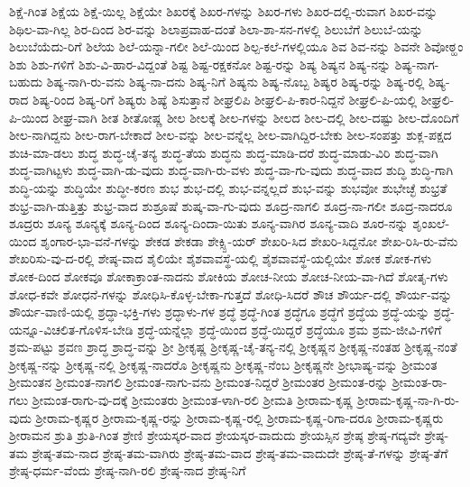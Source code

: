 {ಶಿಕ್ಷೆ-ಗಿಂತ
ಶಿಕ್ಷೆಯ
ಶಿಕ್ಷೆ-ಯಿಲ್ಲ
ಶಿಕ್ಷೆಯೇ
ಶಿಖರಕ್ಕೆ
ಶಿಖರ-ಗಳನ್ನು
ಶಿಖರ-ಗಳು
ಶಿಖರ-ದಲ್ಲಿ-ರುವಾಗ
ಶಿಖರ-ವನ್ನು
ಶಿಥಿಲ-ವಾ-ಗಿಲ್ಲ
ಶಿರ-ದಿಂದ
ಶಿರ-ವನ್ನು
ಶಿಲಾಪ್ರವಾಹ-ದಂತೆ
ಶಿಲಾ-ಶಾ-ಸನ-ಗಳಲ್ಲಿ
ಶಿಲುಬೆಗೆ
ಶಿಲುಬೆ-ಯನ್ನು
ಶಿಲುಬೆಯೆದು-ರಿಗೆ
ಶಿಲೆಯ
ಶಿಲೆ-ಯನ್ನಾ-ಗಲೀ
ಶಿಲೆ-ಯಿಂದ
ಶಿಲ್ಪ-ಕಲೆ-ಗಳಲ್ಲಿಯೂ
ಶಿವ
ಶಿವ-ನನ್ನು
ಶಿವನೇ
ಶಿವೋಠ್ಹಂ
ಶಿಶು
ಶಿಶು-ಗಳಿಗೆ
ಶಿಶು-ವಿ-ಹಾರ-ವಿದ್ದಂತೆ
ಶಿಷ್ಟ
ಶಿಷ್ಟ-ರಕ್ಷಕನೋ
ಶಿಷ್ಟ-ರನ್ನು
ಶಿಷ್ಯ
ಶಿಷ್ಯನ
ಶಿಷ್ಯ-ನನ್ನು
ಶಿಷ್ಯ-ನಾಗ-ಬಹುದು
ಶಿಷ್ಯ-ನಾಗಿ-ರು-ವನು
ಶಿಷ್ಯ-ನಾ-ದನು
ಶಿಷ್ಯ-ನಿಗೆ
ಶಿಷ್ಯನು
ಶಿಷ್ಯ-ನೊಬ್ಬ
ಶಿಷ್ಯರ
ಶಿಷ್ಯ-ರನ್ನು
ಶಿಷ್ಯ-ರಲ್ಲಿ
ಶಿಷ್ಯ-ರಾದ
ಶಿಷ್ಯ-ರಿಂದ
ಶಿಷ್ಯ-ರಿಗೆ
ಶಿಷ್ಯರು
ಶಿಷ್ಯೆ
ಶಿಸುತ್ತಾನೆ
ಶೀಘ್ರಲಿಪಿ
ಶೀಘ್ರಲಿ-ಪಿ-ಕಾರ-ನಿದ್ದನೆ
ಶೀಘ್ರಲಿ-ಪಿ-ಯಲ್ಲಿ
ಶೀಘ್ರಲಿ-ಪಿ-ಯಿಂದ
ಶೀಘ್ರ-ವಾಗಿ
ಶೀತ
ಶೀತೋಷ್ಣ
ಶೀಲ
ಶೀಲಕ್ಕೆ
ಶೀಲ-ಗಳನ್ನು
ಶೀಲದ
ಶೀಲ-ದಲ್ಲಿ
ಶೀಲ-ದಷ್ಟು
ಶೀಲ-ದೊಂದಿಗೆ
ಶೀಲ-ನಾಗಿದ್ದನು
ಶೀಲ-ರಾಗ-ಬೇಕಾದೆ
ಶೀಲ-ವನ್ನು
ಶೀಲ-ವನ್ನೆಲ್ಲ
ಶೀಲ-ವಾಗಿದ್ದಿರ-ಬೇಕು
ಶೀಲ-ಸಂಪತ್ತು
ಶುಕ್ಲ-ಪಕ್ಷದ
ಶುಚಿ-ಮಾ-ಡಲು
ಶುದ್ಧ
ಶುದ್ಧ-ಚೈ-ತನ್ಯ
ಶುದ್ಧ-ತೆಯ
ಶುದ್ಧನು
ಶುದ್ಧ-ಮಾಡಿ-ದರೆ
ಶುದ್ಧ-ಮಾಡು-ವಿರಿ
ಶುದ್ಧ-ವಾಗಿ
ಶುದ್ಧ-ವಾಗಿಟ್ಟಳು
ಶುದ್ಧ-ವಾಗಿ-ಡು-ವುದು
ಶುದ್ಧ-ವಾಗಿ-ರು-ವಳು
ಶುದ್ಧ-ವಾ-ಗು-ವುದು
ಶುದ್ಧ-ವಾದ
ಶುದ್ಧಿ
ಶುದ್ಧಿ-ಗಾಗಿ
ಶುದ್ಧಿ-ಯನ್ನು
ಶುದ್ಧಿಯೇ
ಶುದ್ಧೀ-ಕರಣ
ಶುಭ
ಶುಭ-ದಲ್ಲಿ
ಶುಭ-ವನ್ನಲ್ಲದೆ
ಶುಭ-ವನ್ನು
ಶುಭವೋ
ಶುಭೇಚ್ಛೆ
ಶುಭ್ರತೆ
ಶುಭ್ರ-ವಾಗಿ-ಡುತ್ತಿತ್ತು
ಶುಭ್ರ-ವಾದ
ಶುಶ್ರೂಷೆ
ಶುಷ್ಕ-ವಾ-ಗು-ವುದು
ಶೂದ್ರ-ನಾಗಲಿ
ಶೂದ್ರ-ನಾ-ಗಲೀ
ಶೂದ್ರ-ನಾದರೂ
ಶೂದ್ರರು
ಶೂನ್ಯ
ಶೂನ್ಯಕ್ಕೆ
ಶೂನ್ಯ-ದಿಂದ
ಶೂನ್ಯ-ದಿಂದಾ-ಯಿತು
ಶೂನ್ಯ-ವಾಗಿರ
ಶೂನ್ಯ-ವಾದಿ
ಶೂರ-ನನ್ನು
ಶೃಂಖಲೆ-ಯಿಂದ
ಶೃಂಗಾರ-ಭಾ-ವನೆ-ಗಳನ್ನು
ಶೇಕಡ
ಶೇಕಡಾ
ಶೇಕ್ಸ್ಪಿ-ಯರ್
ಶೇಖರಿ-ಸಿದ
ಶೇಖರಿ-ಸಿದ್ದನೋ
ಶೇಖ-ರಿಸಿ-ರು-ವೆನು
ಶೇಖರಿಸು-ವು-ದ-ರಲ್ಲಿ
ಶೇಷ್ಠ-ವಾದ
ಶೈಲಿಯೇ
ಶೈಶವಾವಸ್ಥೆ-ಯಲ್ಲಿ
ಶೈಶವಾವಸ್ಥೆ-ಯಲ್ಲಿಯೇ
ಶೋಕ
ಶೋಕ-ಗಳು
ಶೋಕ-ದಿಂದ
ಶೋಕವೂ
ಶೋಕಾಕ್ರಾಂತ-ನಾದನು
ಶೋಕಿಯ
ಶೋಚ-ನೀಯ
ಶೋಚ-ನೀಯ-ವಾ-ಗಿದೆ
ಶೋತೃ-ಗಳು
ಶೋಧ-ಕವೇ
ಶೋಧನೆ-ಗಳನ್ನು
ಶೋಧಿಸಿ-ಕೊಳ್ಳ-ಬೇಕಾ-ಗುತ್ತದೆ
ಶೋಧಿ-ಸಿದರೆ
ಶೌಚ
ಶೌರ್ಯ-ದಲ್ಲಿ
ಶೌರ್ಯ-ವನ್ನು
ಶೌರ್ಯ-ವಾಣಿ-ಯಲ್ಲಿ
ಶ್ರದ್ಧಾ-ಭಕ್ತಿ-ಗಳು
ಶ್ರದ್ಧಾಳು-ಗಳ
ಶ್ರದ್ಧೆ
ಶ್ರದ್ಧೆ-ಗಿಂತ
ಶ್ರದ್ಧೆಗೂ
ಶ್ರದ್ಧೆಗೆ
ಶ್ರದ್ಧೆಯ
ಶ್ರದ್ಧೆ-ಯನ್ನು
ಶ್ರದ್ಧೆ-ಯನ್ನೂ-ವಿಚಲಿತ-ಗೊಳಿಸ-ಬೇಡಿ
ಶ್ರದ್ಧೆ-ಯನ್ನೆಲ್ಲಾ
ಶ್ರದ್ಧೆ-ಯಿಂದ
ಶ್ರದ್ಧೆ-ಯಿದ್ದರೆ
ಶ್ರದ್ಧೆಯೂ
ಶ್ರಮ
ಶ್ರಮ-ಜೀವಿ-ಗಳಿಗೆ
ಶ್ರಮ-ಪಟ್ಟು
ಶ್ರವಣ
ಶ್ರಾದ್ಧ
ಶ್ರಾದ್ಧ-ವನ್ನು
ಶ್ರೀ
ಶ್ರೀಕೃಷ್ಣ
ಶ್ರೀಕೃಷ್ಣ-ಚೈ-ತನ್ಯ-ನಲ್ಲಿ
ಶ್ರೀಕೃಷ್ಣನ
ಶ್ರೀಕೃಷ್ಣ-ನಂತಹ
ಶ್ರೀಕೃಷ್ಣ-ನಂತೆ
ಶ್ರೀಕೃಷ್ಣ-ನನ್ನು
ಶ್ರೀಕೃಷ್ಣ-ನಲ್ಲಿ
ಶ್ರೀಕೃಷ್ಣ-ನಾದರೊ
ಶ್ರೀಕೃಷ್ಣನು
ಶ್ರೀಕೃಷ್ಣ-ನೆಂಬ
ಶ್ರೀಕೃಷ್ಣನೇ
ಶ್ರೀಭಾಷ್ಯ-ವನ್ನು
ಶ್ರೀಮಂತ
ಶ್ರೀಮಂತನ
ಶ್ರೀಮಂತ-ನಾಗಲಿ
ಶ್ರೀಮಂತ-ನಾಗು-ವನು
ಶ್ರೀಮಂತ-ನಿದ್ದರೆ
ಶ್ರೀಮಂತರ
ಶ್ರೀಮಂತ-ರನ್ನು
ಶ್ರೀಮಂತ-ರಾ-ಗಲು
ಶ್ರೀಮಂತ-ರಾಗು-ವು-ದಕ್ಕೆ
ಶ್ರೀಮಂತರು
ಶ್ರೀಮಂತ-ಳಾಗಿ-ರಲಿ
ಶ್ರೀಮತಿ
ಶ್ರೀರಾಮ-ಕೃಷ್ಣ
ಶ್ರೀರಾಮ-ಕೃಷ್ಣ-ನಾ-ಗಿ-ರು-ವುದು
ಶ್ರೀರಾಮ-ಕೃಷ್ಣರ
ಶ್ರೀರಾಮ-ಕೃಷ್ಣ-ರನ್ನು
ಶ್ರೀರಾಮ-ಕೃಷ್ಣ-ರಲ್ಲಿ
ಶ್ರೀರಾಮ-ಕೃಷ್ಣ-ರಿಗಾ-ದರೂ
ಶ್ರೀರಾಮ-ಕೃಷ್ಣರು
ಶ್ರೀರಾಮನ
ಶ್ರುತಿ
ಶ್ರುತಿ-ಗಿಂತ
ಶ್ರೇಣಿ
ಶ್ರೇಯಸ್ಕರ-ವಾದ
ಶ್ರೇಯಸ್ಕರ-ವಾದುದು
ಶ್ರೇಯಸ್ಸಿನ
ಶ್ರೇಷ್ಠ
ಶ್ರೇಷ್ಠ-ಗದ್ಯವೇ
ಶ್ರೇಷ್ಠ-ತಮ
ಶ್ರೇಷ್ಠ-ತಮ-ನಾದ
ಶ್ರೇಷ್ಠ-ತಮ-ವಾಗಿರು
ಶ್ರೇಷ್ಠ-ತಮ-ವಾದ
ಶ್ರೇಷ್ಠ-ತಮ-ವಾದುದೇ
ಶ್ರೇಷ್ಠ-ತೆ-ಗಳನ್ನು
ಶ್ರೇಷ್ಠ-ತೆಗೆ
ಶ್ರೇಷ್ಠ-ಧರ್ಮ-ವೆಂದು
ಶ್ರೇಷ್ಠ-ನಾಗಿ-ರಲಿ
ಶ್ರೇಷ್ಠ-ನಾದ
ಶ್ರೇಷ್ಠ-ನಿಗೆ
}

